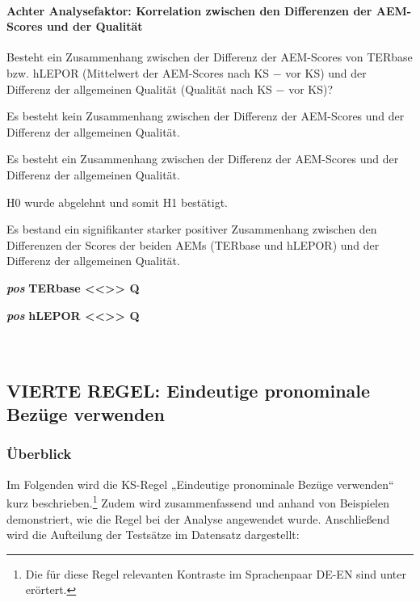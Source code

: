 \paragraph*{Achter Analysefaktor: Korrelation zwischen den Differenzen der AEM-Scores und der Qualität}
\begin{description}[font=\normalfont\bfseries]
\item [Fragestellung:] Besteht ein Zusammenhang zwischen der Differenz der AEM-Scores von TERbase bzw. hLEPOR (Mittelwert der AEM-Scores nach KS $-$ vor KS) und der Differenz der allgemeinen Qualität (Qualität nach KS $-$ vor KS)?
\item [H0 --] Es besteht kein Zusammenhang zwischen der Differenz der AEM-Scores und der Differenz der allgemeinen Qualität.
\item [H1 --] Es besteht ein Zusammenhang zwischen der Differenz der AEM-Scores und der Differenz der allgemeinen Qualität.
\end{description}
\noindent
\parbox[t]{.7\textwidth}{
H0 wurde abgelehnt und somit H1 bestätigt.

Es bestand ein signifikanter starker positiver Zusammenhang zwischen den Differenzen der Scores der beiden AEMs (TERbase und hLEPOR) und der Differenz der allgemeinen Qualität.
}
\parbox[t]{.04\textwidth}{}
\colorbox{smGreen}{\parbox[t]{.25\textwidth}{
\textbf{\textit{pos}} \textbf{TERbase <{}<{}>{}> Q}

 \textbf{\textit{pos}} \textbf{hLEPOR <{}<{}>{}> Q}\\
 \\
 \\
}}


\subsection{VIERTE REGEL: Eindeutige pronominale Bezüge verwenden}
\label{sec:5.3.4}
\subsubsection{\label{sec:5.3.4.0}Überblick}

Im Folgenden wird die KS-Regel „Eindeutige pronominale Bezüge verwenden“ kurz beschrieben.\footnote{\textrm{Die für diese Regel relevanten Kontraste im Sprachenpaar DE-EN sind unter  erörtert.} } Zudem wird zusammenfassend und anhand von Beispielen demonstriert, wie die Regel bei der Analyse angewendet wurde. Anschließend wird die Aufteilung der Testsätze im Datensatz dargestellt:

